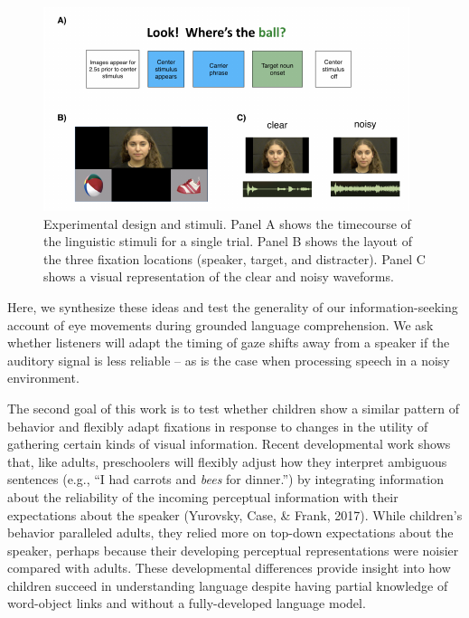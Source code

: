 \documentclass[10pt, letterpaper]{article}
\newenvironment{CodeChunk}{}{}
\begin{document}
\begin{CodeChunk}
\begin{figure}[tb]

{\centering \includegraphics[width=0.75\linewidth]{figs/stimuli_plot-1} 

}

\caption[Experimental design and stimuli]{Experimental design and stimuli. Panel A shows the timecourse of the linguistic stimuli for a single trial. Panel B shows the layout of the three fixation locations (speaker, target, and distracter). Panel C shows a visual representation of the clear and noisy waveforms.}\label{fig:stimuli_plot}
\end{figure}
\end{CodeChunk}

Here, we synthesize these ideas and test the generality of our
information-seeking account of eye movements during grounded language
comprehension. We ask whether listeners will adapt the timing of gaze
shifts away from a speaker if the auditory signal is less reliable -- as
is the case when processing speech in a noisy environment.

The second goal of this work is to test whether children show a similar
pattern of behavior and flexibly adapt fixations in response to changes
in the utility of gathering certain kinds of visual information. Recent
developmental work shows that, like adults, preschoolers will flexibly
adjust how they interpret ambiguous sentences (e.g., ``I had carrots and
\emph{bees} for dinner.'') by integrating information about the
reliability of the incoming perceptual information with their
expectations about the speaker (Yurovsky, Case, \& Frank, 2017). While
children's behavior paralleled adults, they relied more on top-down
expectations about the speaker, perhaps because their developing
perceptual representations were noisier compared with adults. These
developmental differences provide insight into how children succeed in
understanding language despite having partial knowledge of word-object
links and without a fully-developed language model.
\end{document}
